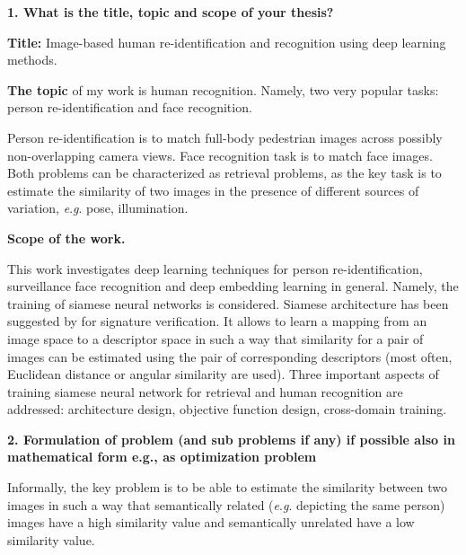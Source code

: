 \documentclass[a4paper, 11pt, oneside]{Thesis}  %
\newcommand{\eg}{\textit{e}.\textit{g}.}
\begin{document}




\mainmatter	  %
\pagestyle{fancy}  %



\bigskip\ident\textbf{1. What is the title, topic and scope of your thesis?}

\textbf{Title:} Image-based human re-identification and
recognition using deep learning methods.

\textbf{The topic} of my work is human recognition. 
Namely, two very popular tasks: person re-identification and face recognition.

Person re-identification is to match full-body pedestrian images across possibly non-overlapping camera views. Face recognition task is to match face images. Both problems can be characterized as retrieval problems, as the key task is to estimate the similarity of two images in the presence of different sources of variation, \eg{} pose, illumination.


\textbf{Scope of the work.}

This work investigates deep learning techniques for person re-identification, surveillance face recognition and deep embedding learning in general. Namely, the training of siamese neural networks is considered. Siamese architecture has been suggested by \cite{Bromley93} for signature verification. It allows to learn a mapping from an image space to a descriptor space in such a way that similarity for a pair of images can be estimated using the pair of corresponding descriptors (most often, Euclidean distance or angular similarity are used). 
Three important aspects of training siamese neural network for retrieval and human recognition are addressed: architecture design, objective function design, cross-domain training.  


\bigskip\ident\textbf{2. Formulation of problem (and sub problems if any) if possible also in mathematical form
e.g., as optimization problem}

Informally, the key problem is to be able to estimate the similarity between two images in such a way that semantically related (\eg{} depicting the same person) images have a high similarity value and semantically unrelated have a low similarity value. 
\end{document}
